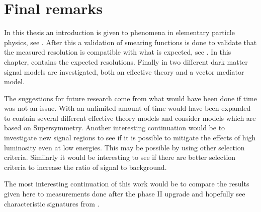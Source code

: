 \chapter{Final remarks}\label{cha:res}
In this thesis an introduction is given to phenomena in elementary particle 
\\physics, see . After this a validation of smearing functions is done to validate that the measured resolution is compatible with what is expected, see . In this chapter,  contains the expected resolutions. Finally in  two different dark matter signal models are investigated, both an effective theory and a vector mediator model.

The suggestions for future research come from what would have been done if time was not an issue. With an unlimited amount of time  would have been expanded to contain several different effective theory models and consider models which are based on Supersymmetry. Another interesting continuation would be to investigate new signal regions to see if it is possible to mitigate the effects of high luminosity even at low energies. This may be possible by using other selection criteria. Similarly it would be interesting to see if there are better selection criteria to increase the ratio of signal to background.  

The most interesting continuation of this work would be to compare the results given here to measurements done after the phase II upgrade and hopefully see characteristic signatures from \abbrWIMPS .